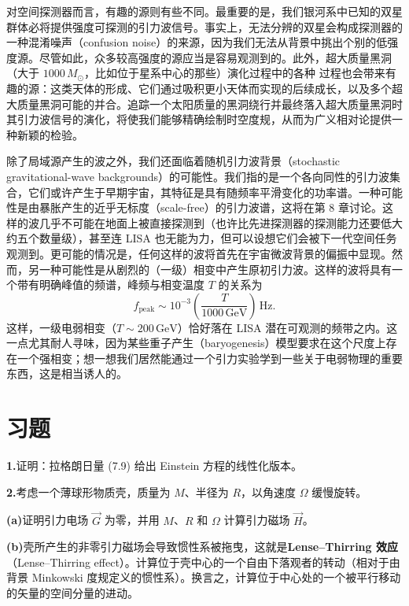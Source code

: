 对空间探测器而言，有趣的源则有些不同。最重要的是，我们银河系中已知的双星群体必将提供强度可探测的引力波信号。事实上，无法分辨的双星会构成探测器的一种混淆噪声（confusion noise）的来源，因为我们无法从背景中挑出个别的低强度源。尽管如此，众多较高强度的源应当是容易观测到的。此外，超大质量黑洞（大于 $1000\,M_\odot$，比如位于星系中心的那些）演化过程中的各种
过程也会带来有趣的源：这类天体的形成、它们通过吸积更小天体而实现的后续成长，以及多个超大质量黑洞可能的并合。追踪一个太阳质量的黑洞绕行并最终落入超大质量黑洞时其引力波信号的演化，将使我们能够精确绘制时空度规，从而为广义相对论提供一种新颖的检验。

除了局域源产生的波之外，我们还面临着随机引力波背景（stochastic gravitational-wave backgrounds）的可能性。我们指的是一个各向同性的引力波集合，它们或许产生于早期宇宙，其特征是具有随频率平滑变化的功率谱。一种可能性是由暴胀产生的近乎无标度（scale-free）的引力波谱，这将在第 8 章讨论。这样的波几乎不可能在地面上被直接探测到（也许比先进探测器的探测能力还要低大约五个数量级），甚至连 LISA 也无能为力，但可以设想它们会被下一代空间任务观测到。更可能的情况是，任何这样的波将首先在宇宙微波背景的偏振中显现。然而，另一种可能性是从剧烈的（一级）相变中产生原初引力波。这样的波将具有一个带有明确峰值的频谱，峰频与相变温度 $T$ 的关系为
\begin{equation*}
f_{\mathrm{peak}} \sim 10^{-3}\left(\frac{T}{1000\,\mathrm{GeV}}\right)\,\mathrm{Hz}.
\tag{7.203}
\end{equation*}
这样，一级电弱相变（$T \sim 200\,\mathrm{GeV}$）恰好落在 LISA 潜在可观测的频带之内。这一点尤其耐人寻味，因为某些重子产生（baryogenesis）模型要求在这个尺度上存在一个强相变；想一想我们居然能通过一个引力实验学到一些关于电弱物理的重要东西，这是相当诱人的。

\section{习题}

\textbf{1.}\quad 证明：拉格朗日量 (7.9) 给出 Einstein 方程的线性化版本。

\textbf{2.}\quad 考虑一个薄球形物质壳，质量为 $M$、半径为 $R$，以角速度 $\Omega$ 缓慢旋转。

\textbf{(a)}\quad 证明引力电场 $\vec{G}$ 为零，并用 $M$、$R$ 和 $\Omega$ 计算引力磁场 $\vec{H}$。

\textbf{(b)}\quad 壳所产生的非零引力磁场会导致惯性系被拖曳，这就是\textbf{Lense--Thirring 效应}（Lense--Thirring effect）。计算位于壳中心的一个自由下落观者的转动（相对于由背景 Minkowski 度规定义的惯性系）。换言之，计算位于中心处的一个被平行移动的矢量的空间分量的进动。

